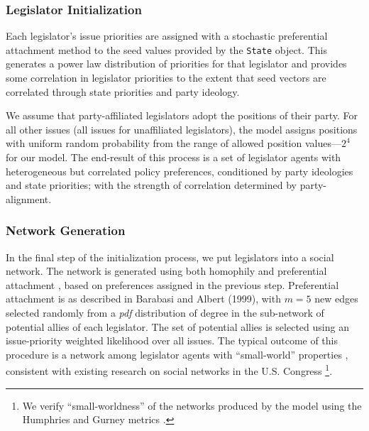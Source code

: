 \documentclass[pdftex,12pt,oribibl]{llncs}
\begin{document}
\subsubsection{Legislator Initialization}
Each legislator's issue priorities are assigned with a stochastic preferential attachment method to the seed values provided by the \texttt{State} object.
This generates a power law distribution of priorities for that legislator and provides some correlation in legislator priorities to the extent that seed vectors are correlated through state priorities and party ideology.

We assume that party-affiliated legislators adopt the positions of their party. 
For all other issues (all issues for unaffiliated legislators), the model assigns positions with uniform random probability from the range of allowed position values---$2^4$ for our model.
The end-result of this process is a set of legislator agents with heterogeneous but correlated policy preferences, conditioned by party ideologies and state priorities; with the strength of correlation determined by party-alignment.

\subsubsection{Network Generation}
In the final step of the initialization process, we put legislators into a social network.
The network is generated using both homophily \parencite{msc01, br11} and preferential attachment \parencite{Barabasi1999}, based on preferences assigned in the previous step. 
Preferential attachment is as described in Barabasi and Albert (1999), with $m=5$ new edges selected randomly from a \textit{pdf} distribution of degree in the sub-network of potential allies of each legislator. 
The set of potential allies is selected using an issue-priority weighted likelihood over all issues.
The typical outcome of this procedure is a network among legislator agents with ``small-world'' properties \parencite{Watts1998}, consistent with existing research on social networks in the U.S. Congress \parencite{Granovetter1978} \footnote{We verify ``small-worldness'' of the networks produced by the model using the Humphries and Gurney metrics \parencite{hg08}.}.
\end{document}
